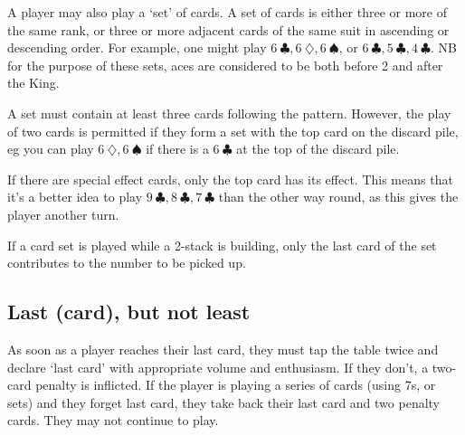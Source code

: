 \documentclass{article}
\begin{document}
    A player may also play a `set' of cards. A set of cards is either three or
    more of the same rank, or three or more adjacent cards of the same suit in
    ascending or descending order. For example, one might play
    $6\ \clubsuit, 6\ \diamondsuit, 6\ \spadesuit$, or
    $6\ \clubsuit, 5\ \clubsuit, 4\ \clubsuit$. NB for the purpose of these
    sets, aces are considered to be both before 2 and after the King.

    A set must contain at least three cards following the pattern. However, the
    play of two cards is permitted if they form a set with the top card on the
    discard pile, eg you can play $6\ \diamondsuit, 6\ \spadesuit$ if there is a 
    $6\ \clubsuit$ at the top of the discard pile.

    If there are special effect cards, only the top card has its effect. This
    means that it's a better idea to play
    $9\ \clubsuit, 8\ \clubsuit, 7\ \clubsuit$
    than the other way round, as this gives the player another turn.

    If a card set is played while a 2-stack is building, only the last card of
    the set contributes to the number to be picked up.

    \subsection{Last (card), but not least}

    As soon as a player reaches their last card, they must tap the table twice
    and declare `last card' with appropriate volume and enthusiasm. If they
    don't, a two-card penalty is inflicted. If the player is playing a series
    of cards (using 7s, or sets) and they forget last card, they take back
    their last card and two penalty cards. They may not continue to play.
\end{document}
